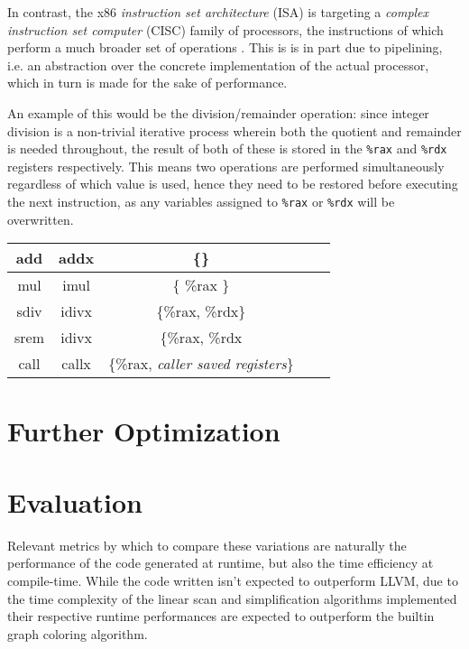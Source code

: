 \documentclass{article}
\begin{document}
In contrast, the x86 \textit{instruction set architecture} (ISA) is targeting a  \textit{complex instruction set computer} (CISC) family of processors, the instructions of which perform a much broader set of operations \cite[p.~190]{tiger}. This is is in part due to pipelining, i.e. an abstraction over the concrete implementation of the actual processor, which in turn is made for the sake of performance.

An example of this would be the division/remainder operation: since integer division is a non-trivial iterative process wherein both the quotient and remainder is needed throughout, the result of both of these is stored in the \lstinline!%rax! and \lstinline!%rdx! registers respectively. This means two operations are performed simultaneously regardless of which value is used, hence they need to be restored before executing the next instruction, as any variables assigned to \lstinline!%rax! or \lstinline!%rdx! will be overwritten.

\begin{center}
\begin{tabular}{|c||c|c|c|c|} 
 \hline
 add & addx & \{\}\\
 \hline
 mul & imul & \{ \%rax \} \\
 \hline
 sdiv & idivx & \{\%rax, \%rdx\} \\
 \hline
 srem & idivx & \{\%rax, \%rdx \\
 \hline
   call & callx & \{\%rax, \textit{caller saved registers}\} \\
 \hline
 \hline
\end{tabular}
\end{center}

%

\section{Further Optimization}



\section{Evaluation}

Relevant metrics by which to compare these variations are naturally the performance of the code generated at runtime, but also the time efficiency at compile-time. While the code written isn't expected to outperform LLVM, due to the time complexity of the linear scan and simplification algorithms implemented their respective runtime performances are expected to outperform the builtin graph coloring algorithm.
\end{document}
